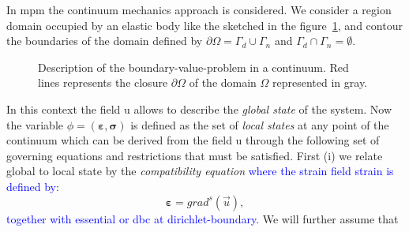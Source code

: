 \documentclass[preprint,12pt,a4paper]{elsarticle}
\newcommand{\tens}[1]{
  \ensuremath{\mathbf{{#1}}}
}
\newcommand\GradS[1]{grad^s({#1})}
\begin{document}
In \acrshort{mpm} the continuum mechanics approach is considered. We consider a region \gls{domain} occupied by an elastic body like
the sketched in the figure~\ref{fig:Continuum-solid}, and \gls{contour} the boundaries of the domain defined by $\partial \Omega
= \Gamma_d \cup \Gamma_n$ and $\Gamma_d \cap  \Gamma_n = \emptyset$.
\begin{figure}
  \centering
  \caption{Description of the boundary-value-problem in a
    continuum. Red lines represents the closure $\partial \Omega$
    of the domain $\Omega$ represented in gray.}
  \label{fig:Continuum-solid}
\end{figure}
In this context the field \gls{u} allows to describe the \textit{global state}
of the system. Now the variable $\phi =
(\tens{\varepsilon},\tens{\sigma})$ is defined as the set of \textit{local
  states} at any point of the continuum which can be derived from the
field \gls{u} through the following set of governing equations and
restrictions that must be satisfied. First (i) we relate global to local state by the \textit{compatibility equation} \textcolor{blue}{where the strain field \gls{strain} is defined by}:
\begin{equation}
  \label{eq:Compatibility-equation}
  \tens{\varepsilon} = \GradS{\vec{u}},
\end{equation}
\textcolor{blue}{together with essential or \acrfull{dbc} at \gls{dirichlet-boundary}.} We will further assume that 
\end{document}

